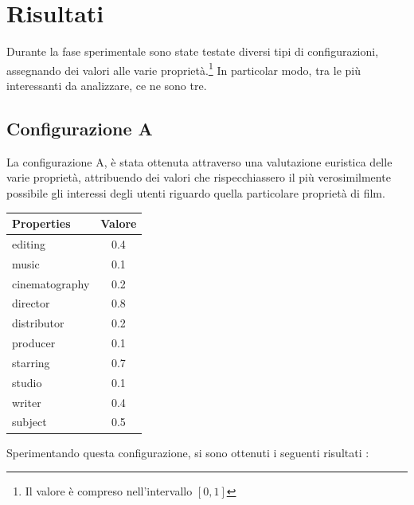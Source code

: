 \section{Risultati}
Durante la fase sperimentale sono state testate diversi tipi di configurazioni, assegnando dei valori alle varie proprietà.\footnote{Il valore è compreso nell'intervallo $[0,1]$} 
In particolar modo, tra le più interessanti da analizzare, ce ne sono tre.

\subsection{Configurazione A}
La configurazione A, è stata ottenuta attraverso una valutazione euristica delle varie proprietà, attribuendo dei valori che rispecchiassero il più verosimilmente possibile gli interessi degli utenti riguardo quella particolare proprietà di film.
\begin{table}[H]
\small
\centering
\begin{tabular}{l c}
Properties & Valore \\\hline
editing & 0.4 \\
music & 0.1 \\
cinematography & 0.2 \\
director & 0.8 \\
distributor & 0.2 \\
producer & 0.1 \\
starring & 0.7 \\
studio & 0.1 \\
writer & 0.4 \\
subject & 0.5 \\
\end{tabular}
\end{table}
Sperimentando questa configurazione, si sono ottenuti i seguenti risultati : 

